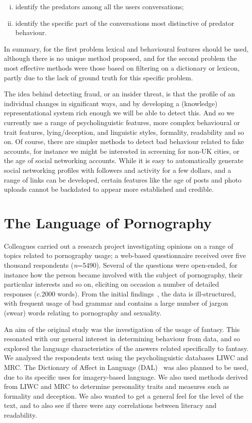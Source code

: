 \documentclass[letterpaper]{article}
\begin{document}
\begin{enumerate}[(i)]
\item identify the predators among all the users conversations;
\item identify the specific part of the conversations most distinctive
  of predator behaviour.
\end{enumerate}

In summary, for the first problem lexical and behavioural features
should be used, although there is no unique method proposed, and for
the second problem the most effective methods were those based on
filtering on a dictionary or lexicon, partly due to the lack of ground
truth for this specific problem.

The idea behind detecting fraud, or an insider threat, is that the
profile of an individual changes in significant ways, and by
developing a (knowledge) representational system rich enough we will
be able to detect this. And so we currently use a range of
psycholinguistic features, more complex behavioural or trait features,
lying/deception, and linguistic styles, formality, readability and so
on. Of course, there are simpler methods to detect bad behaviour
related to fake accounts, for instance we might be interested in
screening for non-UK cities, or the age of social networking
accounts. While it is easy to automatically generate social networking
profiles with followers and activity for a few dollars, and a range of
links can be developed, certain features like the age of posts and
photo uploads cannot be backdated to appear more established and
credible.


\section{The Language of Pornography}

Colleagues carried out a research project investigating opinions on a
range of topics related to pornography usage; a web-based
questionnaire received over five thousand respondents
({\emph{n}}=5490). Several of the questions were open-ended, for
instance how the person became involved with the subject of
pornography, their particular interests and so on, eliciting on
occasion a number of detailed responses (c.2000 words). From the
initial findings~\cite{smith-et-al:2013}, the data is ill-structured,
with frequent usage of bad grammar and contains a large number of
jargon (swear) words relating to pornography and sexuality.

An aim of the original study was the investigation of the usage of
fantasy. This resonated with our general interest in determining
behaviour from data, and so explored the language characteristics of
the answers related specifically to fantasy. We analysed the
respondents text using the psycholinguistic databases LIWC and
MRC. The Dictionary of Affect in Language
(DAL)~\cite{sweeney+whissell:1984} was also planned to be used, due to
its specific uses for imagery-based language. We also used methods
derived from LIWC and MRC to determine personality traits and measures
such as formality and deception. We also wanted to get a general feel
for the level of the text, and to also see if there were any
correlations between literacy and readability.
\end{document}
